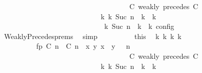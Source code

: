 \begin{isabellebody}
\ \ \ \ \ \ \ \ \ \ \ \ \ \ \ \ \ \ \ \ \ \ \ \ \ \ \ \ \ \ \ \ \ \ {\isasymturnstile}\ {\isasymPsi}\ {\isasymtriangleright}\ {\isacharparenleft}{\isacharparenleft}C\ weakly\ precedes\ C\ {\isacharhash}\ {\isasymPhi}{\isacharparenright}{\isacharparenright}\isanewline
\ \ \ \ \ \ \ \ \ \ \ \ \ \ \ \ \ \ \ \ \ \ \ \ \ \ \ \ \ {\isasymhookrightarrow}\isactrlbsup k\isactrlesup \ {\isacharparenleft}{\isasymGamma}\isactrlsub k{\isacharcomma}\ Suc\ n\ {\isasymturnstile}\ {\isasymPsi}\isactrlsub k\ {\isasymtriangleright}\ {\isasymPhi}\isactrlsub k{\isacharparenright}{\isacharparenright}\isanewline
\ \ \ \ \ \ \ \ \ \ \ \ \ \ \ \ \ \ \ \ \ \ \ \ \ \ {\isasymand}\ {\isacharparenleft}{\isasymrho}\ {\isasymin}\ {\isasymlbrakk}\ {\isasymGamma}\isactrlsub k{\isacharcomma}\ Suc\ n\ {\isasymturnstile}\ {\isasymPsi}\isactrlsub k\ {\isasymtriangleright}\ {\isasymPhi}\isactrlsub k\ {\isasymrbrakk}\isactrlsub c\isactrlsub o\isactrlsub n\isactrlsub f\isactrlsub i\isactrlsub g{\isacharparenright}{\isacartoucheclose}\isanewline
\ \ \ \ \ \ \ \ \ \ \isamarkupfalse%
\ \ WeaklyPrecedes{\isachardot}prems\ \isamarkupfalse%
\ simp\isanewline
\ \ \ \ \ \ \ \ \isamarkupfalse%
\ this\ \isamarkupfalse%
\ {\isasymGamma}\isactrlsub k\ {\isasymPsi}\isactrlsub k\ {\isasymPhi}\isactrlsub k\ k\isanewline
\ \ \ \ \ \ \ \ \ \ \ fp{\isacharcolon}{\isacartoucheopen}{\isacharparenleft}{\isacharparenleft}{\isacharparenleft}{\isasymlceil}{\isacharhash}\isactrlsup {\isasymle}\ C\ n{\isacharcomma}\ {\isacharhash}\isactrlsup {\isasymle}\ C\ n{\isasymrceil}\ {\isasymin}\ {\isacharparenleft}{\isasymlambda}{\isacharparenleft}x{\isacharcomma}\ y{\isacharparenright}{\isachardot}\ x\ {\isasymle}\ y{\isacharparenright}{\isacharparenright}\ {\isacharhash}\ {\isasymGamma}{\isacharparenright}{\isacharcomma}\ n\isanewline
\ \ \ \ \ \ \ \ \ \ \ \ \ \ \ \ \ \ \ \ \ \ \ \ \ \ \ \ \ \ \ \ \ \ {\isasymturnstile}\ {\isasymPsi}\ {\isasymtriangleright}\ {\isacharparenleft}{\isacharparenleft}C\ weakly\ precedes\ C\ {\isacharhash}\ {\isasymPhi}{\isacharparenright}{\isacharparenright}\isanewline
\ \ \ \ \ \ \ \ \ \ \ \ \ \ \ \ \ \ \ \ \ \ \ \ \ \ \ \ \ {\isasymhookrightarrow}\isactrlbsup k\isactrlesup \ {\isacharparenleft}{\isasymGamma}\isactrlsub k{\isacharcomma}\ Suc\ n\ {\isasymturnstile}\ {\isasymPsi}\isactrlsub k\ {\isasymtriangleright}\ {\isasymPhi}\isactrlsub k{\isacharparenright}{\isacartoucheclose}\isanewline

\end{isabellebody}
